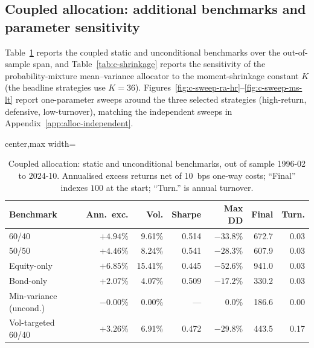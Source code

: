 \FloatBarrier

\subsection{Coupled allocation: additional benchmarks and parameter sensitivity}
\label{app:alloc-coupled-extra}

Table~\ref{tab:c-benchmarks} reports the coupled static and unconditional benchmarks over the
out-of-sample span, and Table~\ref{tab:c-shrinkage} reports the sensitivity of the
probability-mixture mean--variance allocator to the moment-shrinkage constant $K$ (the
headline strategies use $K=36$). Figures~\ref{fig:c-sweep-ra-hr}--\ref{fig:c-sweep-ms-lt}
report one-parameter sweeps around the three selected strategies (high-return, defensive,
low-turnover), matching the independent sweeps in Appendix~\ref{app:alloc-independent}.

\begin{table}[H]
\centering
\caption{Coupled allocation: static and unconditional benchmarks, out of sample 1996-02 to
2024-10. Annualised excess returns net of 10~bps one-way costs; ``Final'' indexes $100$ at
the start; ``Turn.'' is annual turnover.}
\label{tab:c-benchmarks}
\small
\begin{adjustbox}{center,max width=\linewidth}
\begin{tabular}{lrrrrrr}
\toprule
Benchmark & Ann.\ exc. & Vol. & Sharpe & Max DD & Final & Turn. \\
\midrule
60/40 & $+4.94\%$ & 9.61\% & 0.514 & $-33.8\%$ & 672.7 & 0.03 \\
50/50 & $+4.46\%$ & 8.24\% & 0.541 & $-28.3\%$ & 607.9 & 0.03 \\
Equity-only & $+6.85\%$ & 15.41\% & 0.445 & $-52.6\%$ & 941.0 & 0.03 \\
Bond-only & $+2.07\%$ & 4.07\% & 0.509 & $-17.2\%$ & 330.2 & 0.03 \\
Min-variance (uncond.) & $-0.00\%$ & 0.00\% & --- & 0.0\% & 186.6 & 0.00 \\
Vol-targeted 60/40 & $+3.26\%$ & 6.91\% & 0.472 & $-29.8\%$ & 443.5 & 0.17 \\
\bottomrule
\end{tabular}
\end{adjustbox}
\end{table}

